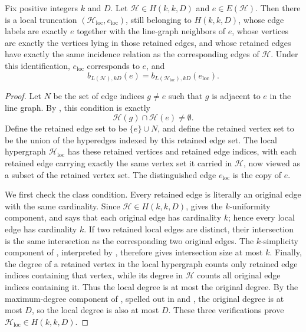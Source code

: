 \begin{helper}
Fix positive integers $k$ and $D$.  Let $\mathcal H\in H(k,k,D)$ and
$e\in E(\mathcal H)$.  Then there is a local truncation
$(\mathcal H_{\mathrm{loc}},e_{\mathrm{loc}})$, still belonging to
$H(k,k,D)$, whose edge labels are exactly $e$ together with the
line-graph neighbors of $e$, whose vertices are exactly the vertices lying
in those retained edges, and whose retained edges have exactly the same
incidence relation as the corresponding edges of $\mathcal H$.  Under this
identification, $e_{\mathrm{loc}}$ corresponds to $e$, and
\[
b_{L(\mathcal H),kD}(e)=
b_{L(\mathcal H_{\mathrm{loc}}),kD}(e_{\mathrm{loc}}).
\]
\end{helper}
\begin{proof}
Let $N$ be the set of edge indices $g\ne e$ such that $g$ is adjacent to
$e$ in the line graph.  By , this condition
is exactly
\[
\mathcal H(g)\cap \mathcal H(e)\ne\emptyset .
\]
Define the retained edge set to be $\{e\}\cup N$, and define the retained
vertex set to be the union of the hyperedges indexed by this retained edge
set.  The local hypergraph $\mathcal H_{\mathrm{loc}}$ has these retained
vertices and retained edge indices, with each retained edge carrying exactly
the same vertex set it carried in $\mathcal H$, now viewed as a subset of
the retained vertex set.  The distinguished edge $e_{\mathrm{loc}}$ is the
copy of $e$.

We first check the class condition.  Every retained edge is literally an
original edge with the same cardinality.  Since $\mathcal H\in H(k,k,D)$,
 gives the $k$-uniformity component, and
 says that each original edge has cardinality
$k$; hence every local edge has cardinality $k$.  If two retained local
edges are distinct, their intersection is the same intersection as the
corresponding two original edges.  The $k$-simplicity component of
, interpreted by ,
therefore gives intersection size at most $k$.  Finally, the degree of a
retained vertex in the local hypergraph counts only retained edge indices
containing that vertex, while its degree in $\mathcal H$ counts all original
edge indices containing it.  Thus the local degree is at most the original
degree.  By the maximum-degree component of ,
spelled out in  and ,
the original degree is at most $D$, so the local degree is also at most
$D$.  These three verifications prove
$\mathcal H_{\mathrm{loc}}\in H(k,k,D)$.


\end{proof}
